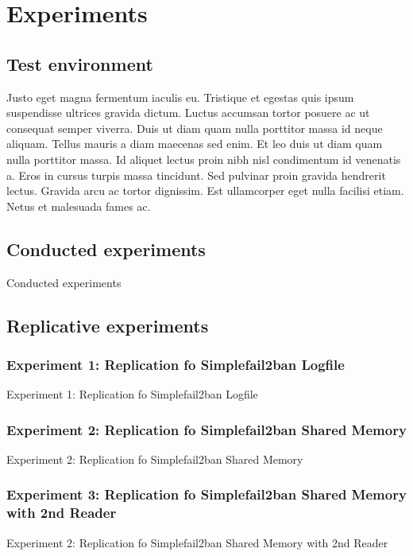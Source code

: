 %
%

\chapter{Experiments}
\label{cha:experiments}

\section{Test environment}
Justo eget magna fermentum iaculis eu. Tristique et egestas quis ipsum suspendisse ultrices gravida dictum. Luctus accumsan tortor posuere ac ut consequat semper viverra. Duis ut diam quam nulla porttitor massa id neque aliquam. Tellus mauris a diam maecenas sed enim. Et leo duis ut diam quam nulla porttitor massa. Id aliquet lectus proin nibh nisl condimentum id venenatis a. Eros in cursus turpis massa tincidunt. Sed pulvinar proin gravida hendrerit lectus. Gravida arcu ac tortor dignissim. Est ullamcorper eget nulla facilisi etiam. Netus et malesuada fames ac.

\section{Conducted experiments}
Conducted experiments

\section{Replicative experiments}

\subsection{Experiment 1: Replication fo Simplefail2ban Logfile}
Experiment 1: Replication fo Simplefail2ban Logfile

\subsection{Experiment 2: Replication fo Simplefail2ban Shared Memory}
Experiment 2: Replication fo Simplefail2ban Shared Memory

\subsection{Experiment 3: Replication fo Simplefail2ban Shared Memory with 2nd Reader}
Experiment 2: Replication fo Simplefail2ban Shared Memory with 2nd Reader

